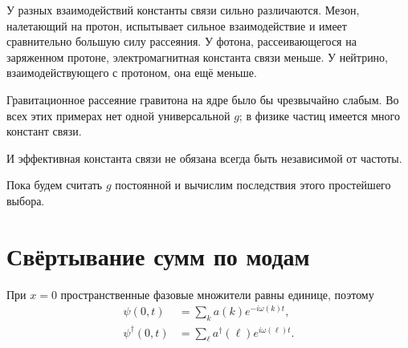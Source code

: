 У разных взаимодействий константы связи сильно различаются. Мезон, налетающий на протон, испытывает сильное взаимодействие и имеет сравнительно большую силу рассеяния. У фотона, рассеивающегося на заряженном протоне, электромагнитная константа связи меньше. У нейтрино, взаимодействующего с протоном, она ещё меньше.

\begin{classroomqa}
\end{classroomqa}

Гравитационное рассеяние гравитона на ядре было бы чрезвычайно слабым. Во всех этих примерах нет одной универсальной \(g\); в физике частиц имеется много констант связи.

И эффективная константа связи не обязана всегда быть независимой от частоты.

\begin{classroomqa}
\end{classroomqa}

Пока будем считать \(g\) постоянной и вычислим последствия этого простейшего выбора.

\begin{classroomqa}
\end{classroomqa}

\section{Свёртывание сумм по модам}

При \(x=0\) пространственные фазовые множители равны единице, поэтому
\begin{align}
\psi(0,t)&=\sum_k a(k)e^{-i\omega(k)t},\\
\psi^\dagger(0,t)&=\sum_\ell a^\dagger(\ell)e^{i\omega(\ell)t}.
\end{align}

